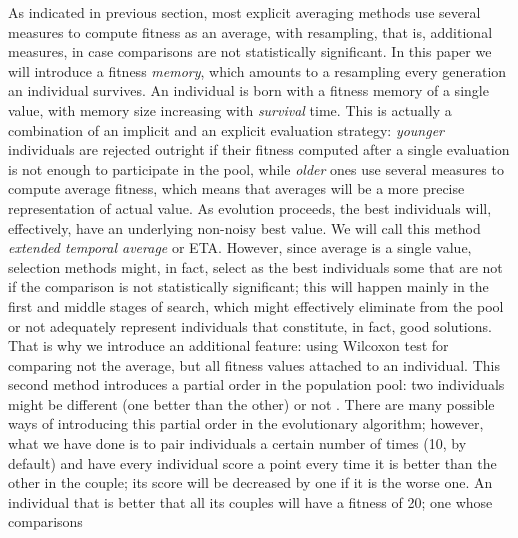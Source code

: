 \documentclass{llncs}
\begin{document}
As indicated in previous section, 
most explicit averaging methods
use several measures to compute fitness as an average, with
resampling, that is, additional measures, in case 
comparisons are not
statistically significant. In this paper we will introduce a fitness
{\em memory}, which amounts 
to a resampling every generation an
individual survives. An individual is born with a fitness
memory of a single value, with memory size increasing with {\em
  survival} time. This is actually a combination of an implicit and an 
explicit evaluation strategy: {\em younger} individuals are rejected
outright if their fitness computed after a single evaluation is not
enough to participate in the pool, while  {\em older} ones use several
measures to compute average fitness, which means that averages will be
a more precise representation of actual value. 
As evolution proceeds,
the best individuals will, effectively, have an underlying non-noisy
best value. We will call this method {\em extended temporal average}
or {\sf ETA}. 
However, since average is a single value, selection methods might, in
fact, select as the best individuals some that are not if the comparison
is not statistically significant; this will happen mainly in the first
and middle stages of search, which might effectively eliminate from
the pool 
or not adequately represent individuals that constitute, in
fact, good solutions. That is why we introduce an additional feature:
using Wilcoxon test \cite{wilcoxon:1945}
for comparing not the average, but all
fitness values attached to an individual. This second method
introduces a partial order in the population pool: two individuals
might be different (one better than the other) or not \cite{wilcoxon:ga}. There are many
possible ways of introducing this partial order in the evolutionary
algorithm; however, what we have done is to pair individuals a certain
number of times (10, by default) and have every individual score a
point every time it is better than the other in the couple; its score
will be decreased by one if it is the worse one. An individual that is better
that all its couples will have a fitness of 20; one whose comparisons
\end{document}
